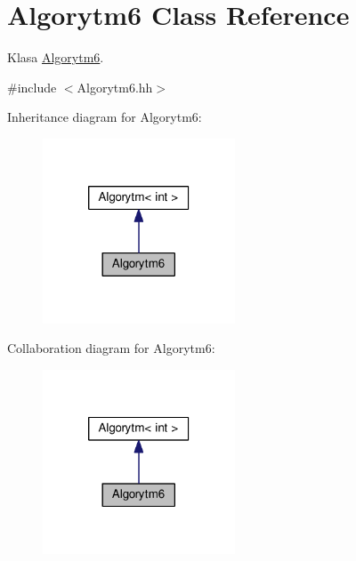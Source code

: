\hypertarget{a00007}{}\section{Algorytm6 Class Reference}
\label{a00007}


Klasa \hyperlink{a00007}{Algorytm6}.  




{\ttfamily \#include $<$Algorytm6.\+hh$>$}



Inheritance diagram for Algorytm6\+:
\nopagebreak
\begin{figure}[H]
\begin{center}
\leavevmode
\includegraphics[width=162pt]{a00133}
\end{center}
\end{figure}


Collaboration diagram for Algorytm6\+:
\nopagebreak
\begin{figure}[H]
\begin{center}
\leavevmode
\includegraphics[width=162pt]{a00134}
\end{center}
\end{figure}
